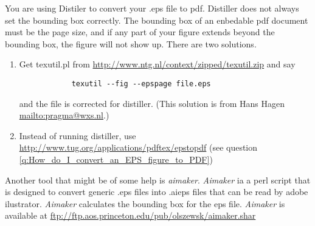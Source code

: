 \documentclass[11pt]{article}
\begin{document}
{ 

  You are using Distiler to convert your .eps file to pdf.  Distiller
  does not always set the bounding box correctly. The bounding box of
  an enbedable pdf document must be the page size, and if any part of
  your figure extends beyond the bounding box, the figure will not
  show up.  There are two solutions.

  \begin{enumerate}
    \item{ Get texutil.pl from
        \url{http://www.ntg.nl/context/zipped/texutil.zip} and say
        \begin{verbatim}
            texutil --fig --epspage file.eps
        \end{verbatim}
        and the file is corrected for distiller. (This solution is
        from Hans Hagen \url{mailto:pragma@wxs.nl}.)}
    \item{Instead of running distiller, use
        \url{http://www.tug.org/applications/pdftex/epstopdf} (see
        question \ref{q:How_do_I_convert_an_EPS_figure_to_PDF})}
  \end{enumerate}

  Another tool that might be of some help is \textit{aimaker}.
  \textit{Aimaker} ia a perl script that is designed to convert
  generic .eps files into .aieps files that can be read by adobe
  ilustrator.  \textit{Aimaker} calculates the bounding box for the
  eps file. \textit{Aimaker} is available at
  \url{ftp://ftp.aos.princeton.edu/pub/olszewsk/aimaker.shar}
}



{ }




{ }



 



\end{document}
